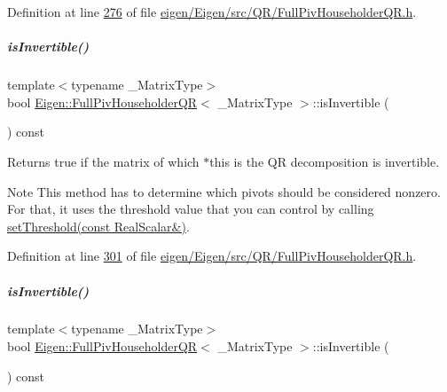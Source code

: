 Definition at line \hyperlink{eigen_2_eigen_2src_2_q_r_2_full_piv_householder_q_r_8h_source_l00276}{276} of file \hyperlink{eigen_2_eigen_2src_2_q_r_2_full_piv_householder_q_r_8h_source}{eigen/\+Eigen/src/\+Q\+R/\+Full\+Piv\+Householder\+Q\+R.\+h}.

\mbox{\label{group___q_r___module_aeb1d779ec22ec68a5a28d4235db02ec1}} 
\subparagraph{\texorpdfstring{is\+Invertible()}{isInvertible()}\hspace{0.1cm}{\footnotesize\ttfamily [1/2]}}
{\footnotesize\ttfamily template$<$typename \+\_\+\+Matrix\+Type$>$ \\
bool \hyperlink{group___q_r___module_class_eigen_1_1_full_piv_householder_q_r}{Eigen\+::\+Full\+Piv\+Householder\+QR}$<$ \+\_\+\+Matrix\+Type $>$\+::is\+Invertible (\begin{DoxyParamCaption}{ }\end{DoxyParamCaption}) const\hspace{0.3cm}{\ttfamily [inline]}}

\begin{DoxyReturn}{Returns}
true if the matrix of which $\ast$this is the QR decomposition is invertible.
\end{DoxyReturn}
\begin{DoxyNote}{Note}
This method has to determine which pivots should be considered nonzero. For that, it uses the threshold value that you can control by calling \hyperlink{group___q_r___module_a92277e572bf98245891015d12dd2b602}{set\+Threshold(const Real\+Scalar\&)}. 
\end{DoxyNote}


Definition at line \hyperlink{eigen_2_eigen_2src_2_q_r_2_full_piv_householder_q_r_8h_source_l00301}{301} of file \hyperlink{eigen_2_eigen_2src_2_q_r_2_full_piv_householder_q_r_8h_source}{eigen/\+Eigen/src/\+Q\+R/\+Full\+Piv\+Householder\+Q\+R.\+h}.

\mbox{\label{group___q_r___module_aeb1d779ec22ec68a5a28d4235db02ec1}} 
\subparagraph{\texorpdfstring{is\+Invertible()}{isInvertible()}\hspace{0.1cm}{\footnotesize\ttfamily [2/2]}}
{\footnotesize\ttfamily template$<$typename \+\_\+\+Matrix\+Type$>$ \\
bool \hyperlink{group___q_r___module_class_eigen_1_1_full_piv_householder_q_r}{Eigen\+::\+Full\+Piv\+Householder\+QR}$<$ \+\_\+\+Matrix\+Type $>$\+::is\+Invertible (\begin{DoxyParamCaption}{ }\end{DoxyParamCaption}) const\hspace{0.3cm}{\ttfamily [inline]}}

